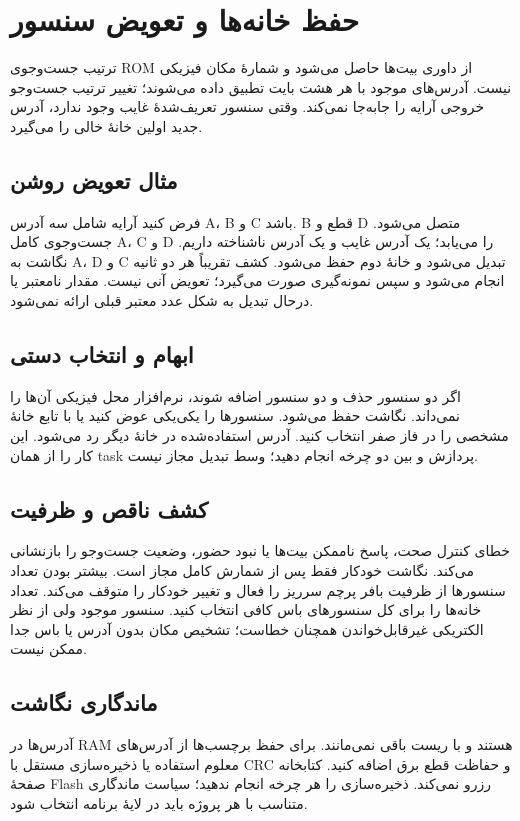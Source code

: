 \section{حفظ خانه‌ها و تعویض سنسور}
ترتیب جست‌وجوی ROM از داوری بیت‌ها حاصل می‌شود و شمارهٔ مکان فیزیکی نیست.
آدرس‌های موجود با هر هشت بایت تطبیق داده می‌شوند؛ تغییر ترتیب جست‌وجو خروجی
آرایه را جابه‌جا نمی‌کند. وقتی سنسور تعریف‌شدهٔ غایب وجود ندارد، آدرس جدید
اولین خانهٔ خالی را می‌گیرد.

\subsection{مثال تعویض روشن}
فرض کنید آرایه شامل سه آدرس A، B و C باشد. B قطع و D متصل می‌شود. جست‌وجوی
کامل A، C و D را می‌یابد؛ یک آدرس غایب و یک آدرس ناشناخته داریم. نگاشت به
A، D و C تبدیل می‌شود و خانهٔ دوم حفظ می‌شود. کشف تقریباً هر دو ثانیه انجام
می‌شود و سپس نمونه‌گیری صورت می‌گیرد؛ تعویض آنی نیست. مقدار نامعتبر یا درحال
تبدیل به شکل عدد معتبر قبلی ارائه نمی‌شود.

\subsection{ابهام و انتخاب دستی}
اگر دو سنسور حذف و دو سنسور اضافه شوند، نرم‌افزار محل فیزیکی آن‌ها را نمی‌داند.
نگاشت حفظ می‌شود. سنسورها را یکی‌یکی عوض کنید یا با تابع
خانهٔ مشخصی را در فاز صفر انتخاب کنید. آدرس استفاده‌شده در خانهٔ دیگر رد می‌شود.
این کار را از همان task پردازش و بین دو چرخه انجام دهید؛ وسط تبدیل مجاز نیست.

\subsection{کشف ناقص و ظرفیت}
خطای کنترل صحت، پاسخ ناممکن بیت‌ها یا نبود حضور، وضعیت جست‌وجو را بازنشانی
می‌کند. نگاشت خودکار فقط پس از شمارش کامل مجاز است. بیشتر بودن تعداد سنسورها
از ظرفیت بافر پرچم سرریز را فعال و تغییر خودکار را متوقف می‌کند. تعداد خانه‌ها
را برای کل سنسورهای باس کافی انتخاب کنید. سنسور موجود ولی از نظر الکتریکی
غیرقابل‌خواندن همچنان خطاست؛ تشخیص مکان بدون آدرس یا باس جدا ممکن نیست.

\subsection{ماندگاری نگاشت}
آدرس‌ها در RAM هستند و با ریست باقی نمی‌مانند. برای حفظ برچسب‌ها از آدرس‌های
معلوم استفاده یا ذخیره‌سازی مستقل با CRC و حفاظت قطع برق اضافه کنید. کتابخانه
صفحهٔ Flash رزرو نمی‌کند. ذخیره‌سازی را هر چرخه انجام ندهید؛ سیاست ماندگاری
متناسب با هر پروژه باید در لایهٔ برنامه انتخاب شود.
